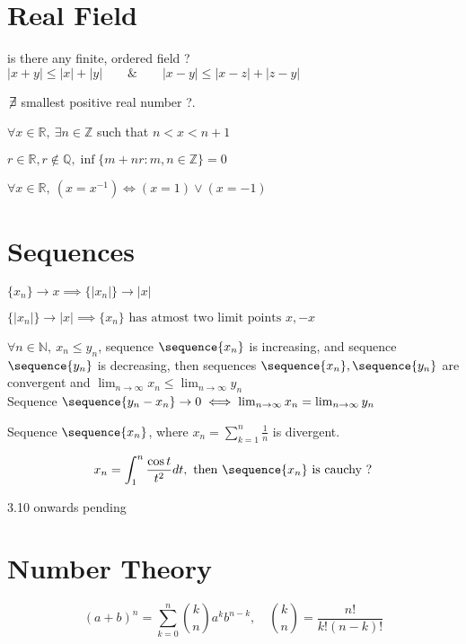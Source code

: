 \section{Real Field}
	\begin{remark}
		is there any finite, ordered field ?\\
		$|x+y| \le |x|+|y| \qquad \& \qquad |x-y| \le |x-z|+|z-y|$
	\end{remark}
	\begin{theorem}
		$\not\!\exists$ smallest positive real number ?.
	\end{theorem}
	\begin{theorem}
		$\forall x \in \mathbb{R},\ \exists n \in \mathbb{Z}$ such that $n < x < n+1$
	\end{theorem}
	\begin{remark}
		$r \in \mathbb{R}, r \not\in \mathbb{Q}, \inf\{ m+nr : m,n \in \mathbb{Z} \} = 0$
	\end{remark}
	\begin{remark}
		$\forall x \in \mathbb{R},\ (x=x^{-1}) \iff (x = 1) \vee (x = -1)$
	\end{remark}
\section{Sequences}
	\begin{theorem}
		$\{x_n\} \to x \implies \{|x_n|\} \to |x|$
	\end{theorem}
	\begin{remark}
		$\{|x_n|\} \to |x| \implies \{x_n\} \text{ has atmost two limit points } x, -x$
	\end{remark}
	\begin{remark}\cite{kham1}
		$\forall n \in \mathbb{N},\ x_n \le y_n$, sequence $\sequence{x_n}$ is increasing, and sequence $\sequence{y_n}$ is decreasing, then sequences $\sequence{x_n},\sequence{y_n}$ are convergent and $\lim_{n \to \infty} x_n \le \lim_{n \to \infty} y_n$\\
		Sequence $\sequence{y_n-x_n} \to 0 \iff \lim_{n \to \infty} x_n = \lim_{n \to \infty} y_n$
	\end{remark}
	\begin{remark}
		Sequence $\sequence{x_n}$, where $x_n = \sum_{k=1}^n \frac{1}{n}$ is divergent.
	\end{remark}
	\begin{remark}\cite{kham1}
		$$x_n = \int_1^n \frac{\cos t}{t^2}dt, \text{ then } \sequence{x_n} \text{ is cauchy ?}$$
	\end{remark}
	\cite{kham1} 3.10 onwards pending
\section{Number Theory}
	\begin{theorem}
		$$(a+b)^n = \sum_{k=0}^n \binom{k}{n} a^k b^{n-k},\quad \binom{k}{n} = \frac{n!}{k!(n-k)!}$$
	\end{theorem}
